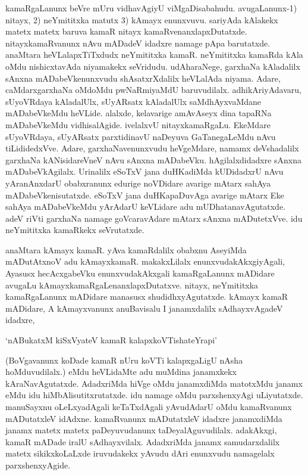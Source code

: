 kamaRgaLanunx beVre mUru vidhavAgiyU viMgaDisabahudu. avugaLanunx-1) nitayx, 2) neYmititxka matutx 3) kAmayx enunxvuvu. sariyAda kAlakekx matetx matetx baruva kamaR nitayx kamaRvenanxlapxDutatxde. nitayxkamaRvanunx nAvu mADadeV idadxre namage pApa barutatxde. anaMtara heVLalapxTiTxdudx neYmititxka kamaR. neYmititxka kamaRda kAla oMdu nishicxtavAda niyamakekx seVridudu. udAharaNege, garxhaNa kAladalilx sAnxna mADabeVkenunxvudu shAsatxrXdalilx heVLalAda niyama. Adare, caMdarxgarxhaNa oMdoMdu pwNaRmiyaMdU baruvudilalx. adhikAriyAdavaru, sUyoVRdaya kAladalUlx, sUyARsatx kAladalUlx saMdhAyxvaMdane mADabeVkeMdu heVLide. alalxde, kelavarige amAvAseyx dina tapaRNa mADabeVkeMdu vidhisalAgide. ivelalxvU nitayxkamaRgaLu. EkeMdare sUyoVRdaya, sUyARsatx parxtidinavU naDeyuva GaTanegaLeMdu nAvu tiLididedxVve. Adare, garxhaNavenunxvudu heVgeMdare, namamx deVshadalilx garxhaNa kANisidareVneV nAvu sAnxna mADabeVku. hAgilalxdidadxre sAnxna mADabeVkAgilalx. Urinalilx eSoTxV jana duHKadiMda kUDidadxrU nAvu yAranAnxdarU obabxranunx edurige noVDidare avarige mAtarx sahAya mADabeVkenisutatxde. eSoTxV jana duHKapaDuvAga avarige mAtarx Eke sahAya mADabeVkeMdu yArAdarU keVLidare adu mUDhatanavAgutatxde. adeV riVti garxhaNa namage goVcaravAdare mAtarx sAnxna mADutetxVve. idu neYmititxka kamaRkekx seVrutatxde.

anaMtara kAmayx kamaR. yAva kamaRdalilx obabxnu AseyiMda mADutAtxnoV adu kAmayxkamaR. makakxLilalx enunxvudakAkxgiyAgali, Ayasusx hecAcxgabeVku enunxvudakAkxgali kamaRgaLanunx mADidare avugaLu kAmayxkamaRgaLenanxlapxDutatxve. nitayx, neYmititxka kamaRgaLanunx mADidare manasusx shudidhxyAgutatxde. kAmayx kamaR mADidare, A kAmayxvanunx anuBavisalu I janamxdalilx sAdhayxvAgadeV idadxre,

\begin{shloka}
`nABukatxM kiSxVyateV kamaR kalapxkoVTishateYrapi'
\end{shloka}

(BoVgavanunx koDade kamaR nUru koVTi kalapxgaLigU nAsha hoMduvudilalx.) eMdu heVLidaMte adu muMdina janamxkekx kAraNavAgutatxde. AdadxriMda hiVge oMdu janamxdiMda matotxMdu janamx eMdu idu hiMbAlisutitxrutatxde. idu namage oMdu parxshenxyAgi uLiyutatxde. manuSayxnu oLeLxyadAgali keTaTxdAgali yAvudAdarU oMdu kamaRvanunx mADutatxleV idAdxne. kamaRvanunx mADutatxleV idadxre janamxdiMda janamx matetx matetx paDeyuvudanunx taDeyalAguvudilalx. adakAkxgi, kamaR mADade iralU sAdhayxvilalx. AdadxriMda janamx samudarxdalilx matetx sikikxkoLaLxde iruvudakekx yAvudu dAri enunxvudu namagelalx parxshenxyAgide.

